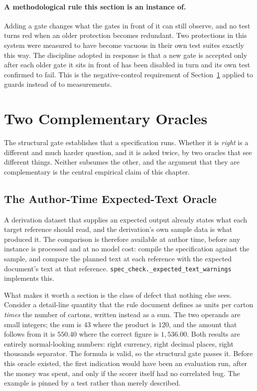 \paragraph{A methodological rule this section is an instance of.}
Adding a gate changes what the gates in front of it can still observe, and no test turns red when
an older protection becomes redundant. Two protections in this system were measured to have become
vacuous in their own test suites exactly this way. The discipline adopted in response is that a new
gate is accepted only after each older gate it sits in front of has been disabled in turn and its
own test confirmed to fail. This is the negative-control requirement of
Section~\ref{sec:der:oracles} applied to guards instead of to measurements.

\section{Two Complementary Oracles}
\label{sec:der:oracles}

The structural gate establishes that a specification runs. Whether it is \emph{right} is a
different and much harder question, and it is asked twice, by two oracles that see different
things. Neither subsumes the other, and the argument that they are complementary is the central
empirical claim of this chapter.

\subsection{The Author-Time Expected-Text Oracle}
\label{sec:der:oracles:authortime}

A derivation dataset that supplies an expected output already states what each target reference
should read, and the derivation's own sample data is what produced it. The comparison is therefore
available at author time, before any instance is processed and at no model cost: compile the
specification against the sample, and compare the planned text at each reference with the expected
document's text at that reference. \texttt{spec\_check.\_expected\_text\_warnings} implements this.

What makes it worth a section is the class of defect that nothing else sees. Consider a detail-line
quantity that the rule document defines as units per carton \emph{times} the number of cartons,
written instead as a sum. The two operands are small integers; the sum is $43$ where the product is
$120$, and the amount that follows from it is $550.40$ where the correct figure is $1{,}536.00$.
Both results are entirely normal-looking numbers: right currency, right decimal places, right
thousands separator. The formula is valid, so the structural gate passes it. Before this oracle
existed, the first indication would have been an evaluation run, after the money was spent, and
only if the scorer itself had no correlated bug. The example is pinned by a test rather than merely
described.

